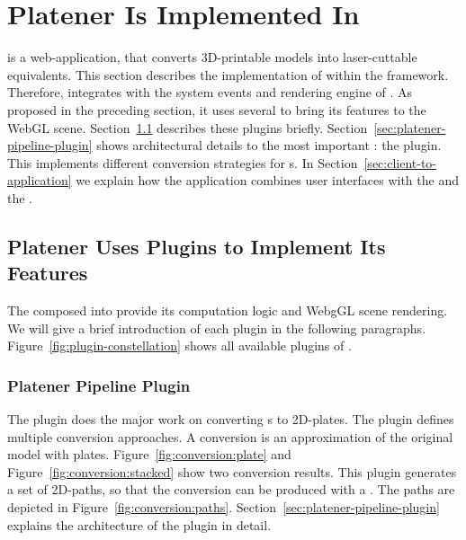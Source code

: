 \documentclass[../../ClassicThesis.tex]{subfiles}
\begin{document}
\section{Platener Is Implemented In {\convertify}}
\label{sec:application-platener}


{\platener} is a web-application, that converts 3D-printable
models into laser-cuttable equivalents. This section
describes the implementation of {\platener} within the
{\convertify} framework. Therefore, {\platener} integrates
with the system events and rendering engine of
{\convertify}. As proposed in the preceding section, it uses
several  to bring its features to the WebGL
scene. Section~\ref{sec:platener-uses-plugins} describes
these plugins briefly.
Section~\ref{sec:platener-pipeline-plugin} shows
architectural details to the most important :
the  plugin. This 
implements different conversion strategies for
{\threedmodel}s. In Section~\ref{sec:client-to-application}
we explain how the application combines user interfaces with
the  and the .

\subsection{Platener Uses Plugins to Implement Its Features}
\label{sec:platener-uses-plugins}

The  composed into {\platener} provide its computation
logic and WebgGL scene rendering. We will give a brief introduction of
each plugin in the following paragraphs.
Figure~\ref{fig:plugin-constellation} shows all available plugins of
{\platener}.

\subsubsection{Platener Pipeline Plugin}

The  plugin does the major work on
converting {\threedmodel}s to 2D-plates. The plugin defines
multiple conversion approaches. A conversion is an
approximation of the original model with plates.
Figure~\ref{fig:conversion:plate} and
Figure~\ref{fig:conversion:stacked} show two conversion
results. This plugin generates a set of 2D-paths, so that
the conversion can be produced with a {\lasercutter}. The
paths are depicted in Figure~\ref{fig:conversion:paths}.
Section~\ref{sec:platener-pipeline-plugin} explains the
architecture of the  plugin in
detail.
\end{document}
